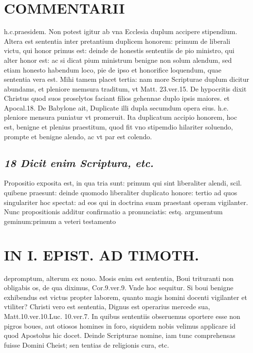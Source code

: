 \documentclass{article}
\begin{document}
\begin{pages}
\section*{COMMENTARII }
\marginpar{[ p.132 ]}\pstart h.c.praesidem. Non potest igitur ab vna Ecclesia duplum accipere stipendium. Altera est sententia inter pretantium duplicem honorem: primum de liberali victu, qui honor primus est: deinde de honestis sententiis de pio ministro, qui alter honor est: ac si dicat pium ministrum benigne non solum alendum, sed etiam honesto habendum loco, pie de ipso et honorifice loquendum, quae sententia vera est. Mihi tamem placet tertia: nam more Scripturae duplum dicitur abundams, et pleniore memsura traditum, vt Matt. 23.ver.15. De hypocritis dixit Christus quod suos proselytos faciant filios gehennae duplo ipsis maiores. et Apocal.18. De Babylone ait, Duplicate illi dupla secumdum opera eius. h.e. pleniore mensura puniatur vt promeruit. Ita duplicatum accipio honorem, hoc est, benigne et plenius praestitum, quod fit vno stipemdio hilariter soluendo, prompte et benigne alendo, ac vt par est colendo.  \pend
{}
{}
\subsection*{\textit{18 Dicit enim Scriptura, etc. }}\pstart Propositio exposita est, in qua tria sunt: primum qui sint liberaliter alendi, scil. quibene praesunt: deinde quomodo liberaliter duplicato honore: tertio ad quos singulariter hoc spectat: ad eos qui in doctrina suam praestant operam vigilanter. Nunc propositionis additur confirmatio a pronunciatis: estq. argumentum geminum:primum a veteri testamento  \pend
\section*{IN I. EPIST. AD TIMOTH. }
\marginpar{[ p.133 ]}\pstart depromptum, alterum ex nouo. Mosis enim est sententia, Boui trituranti non obligabis os, de qua diximus, Cor.9.ver.9. Vnde hoc sequitur. Si boui benigne exhibendus est victus propter laborem, quanto magis homini docenti vigilanter et vtiliter? Christi vero est sententia, Dignus est operarius mercede sua, Matt.10.ver.10.Luc. 10.ver.7. In quibus  sententiis obseruemus oportere esse non pigros boues, aut otiosos homines in foro, siquidem nobis velimus applicare id quod Apostolus hic docet. Deinde Scripturae nomine, iam tunc comprehensas fuisse Domini Cheist; sen tentias de religionis cura, etc.  \pend
{}
{}

\end{pages}
\end{document}
